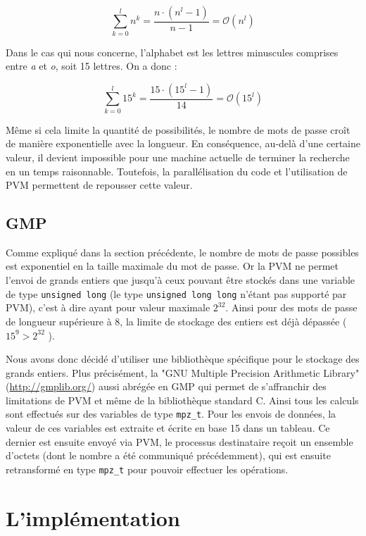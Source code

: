 \documentclass[a4paper,11pt]{article}
\begin{document}
\[
\sum_{k=0}^{l}n^k = \frac{n \cdot (n^l - 1)}{n - 1} = \mathcal{O}(n^l)
\]

Dans le cas qui nous concerne, l'alphabet est les lettres minuscules comprises entre \emph{a} et \emph{o}, soit 15 lettres. On a donc :

\[
\sum_{k=0}^{l}15^k = \frac{15 \cdot (15^l - 1)}{14} = \mathcal{O}(15^l)
\]

Même si cela limite la quantité de possibilités, le nombre de mots de passe croît de manière exponentielle avec la longueur. En conséquence, au-delà d'une certaine valeur, il devient impossible pour une machine actuelle de terminer la recherche en un temps raisonnable. Toutefois, la parallélisation du code et l'utilisation de PVM permettent de repousser cette valeur.

\subsection{GMP}
Comme expliqué dans la section précédente, le nombre de mots de passe possibles est exponentiel en la taille maximale du mot de passe. Or la PVM ne permet l'envoi de grands entiers que jusqu'à ceux pouvant être stockés dans une variable de type  \texttt{unsigned long} (le type \texttt{unsigned long long} n'étant pas supporté par PVM), c'est à dire ayant pour valeur maximale $2^{32}$. Ainsi pour des mots de passe de longueur supérieure à 8, la limite de stockage des entiers est déjà dépassée ($15^{9} > 2^{32}$ ). 

Nous avons donc décidé d'utiliser une bibliothèque spécifique pour le stockage des grands entiers. Plus précisément, la "GNU Multiple Precision Arithmetic Library" (\url{http://gmplib.org/}) aussi abrégée en GMP qui permet de s'affranchir des limitations de PVM et même de la bibliothèque standard C.
Ainsi tous les calculs sont effectués sur des variables de type \texttt{mpz\_t}. Pour les envois de données, la valeur de ces variables est extraite et écrite en base 15 dans un tableau. Ce dernier est ensuite envoyé via PVM, le processus destinataire reçoit un ensemble d'octets (dont le nombre a été communiqué précédemment), qui est ensuite retransformé en type \texttt{mpz\_t} pour pouvoir effectuer les opérations.


\section{L'implémentation}
\end{document}
